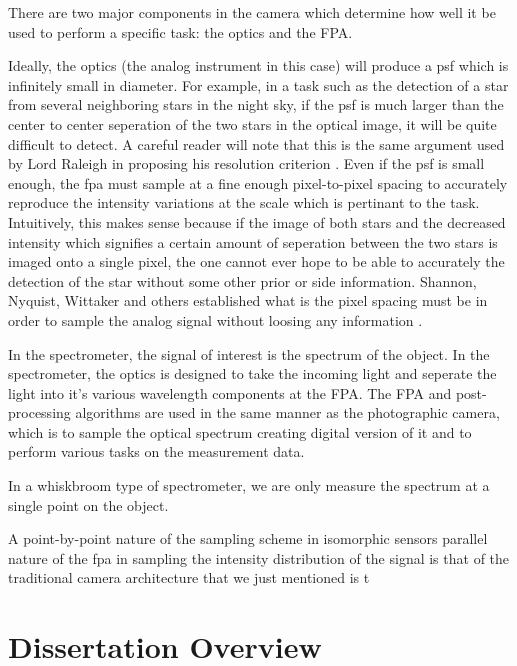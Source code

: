 There are two major components in the camera which determine how well it be used to perform a specific task: the optics and the FPA. 

Ideally, the optics (the analog instrument in this case) will produce a \gls{psf} which is infinitely small in diameter. For example, in a task such as the detection of a star from several neighboring stars in the night sky, if the \gls{psf} is much larger than the center to center seperation of the two stars in the optical image, it will be quite difficult to detect. A careful reader will note that this is the same argument used by Lord Raleigh in proposing his resolution criterion \cite{rayleigh1879investigations}. Even if the \gls{psf} is small enough, the \gls{fpa} must sample at a fine enough pixel-to-pixel spacing to accurately reproduce the intensity variations at the scale which is pertinant to the task. Intuitively, this makes sense because if the image of both stars and the decreased intensity which signifies a certain amount of seperation between the two stars is imaged onto a single pixel, the one cannot ever hope to be able to accurately the detection of the star without some other prior or side information. Shannon, Nyquist, Wittaker and others established what is the pixel spacing must be in order to sample the analog signal without loosing any information \cite{shannon1949communication, nyquist1924certain, shannon1949communication}. 

In the spectrometer, the signal of interest is the spectrum of the object. In the spectrometer, the optics is designed to take the incoming light and seperate the light into it's various wavelength components at the \gls{FPA}. The \gls{FPA} and post-processing algorithms are used in the same manner as the photographic camera, which is to sample the optical spectrum creating digital version of it and to perform various tasks on the measurement data.

In a whiskbroom type of spectrometer, we are only measure the spectrum at a single point on the object. 

A  point-by-point nature of the sampling scheme in isomorphic sensors parallel nature of the \gls{fpa} in sampling the intensity distribution of the signal is that of the traditional camera architecture that we just mentioned is t
\section{Dissertation Overview}

